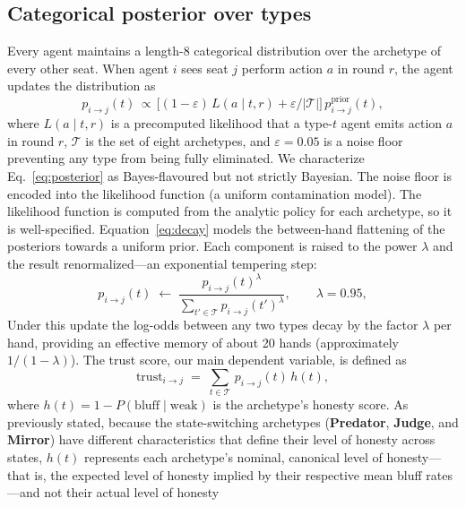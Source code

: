 \documentclass[10pt,twocolumn,letterpaper]{article}
\newcommand{\arch}[1]{\textbf{#1}}
\begin{document}
\subsection{Categorical posterior over types}\label{sec:posterior}
Every agent maintains a length-8 categorical distribution over the
archetype of every other seat. When agent $i$ sees seat $j$ perform
action $a$ in round $r$, the agent updates the distribution as
\begin{equation}
  p_{i\to j}(t)\,\propto\,
    \bigl[(1-\varepsilon)\,L(a\mid t,r)
          + \varepsilon/|\mathcal{T}|\bigr]\,
    p_{i\to j}^{\text{prior}}(t),
  \label{eq:posterior}
\end{equation}
where $L(a\mid t, r)$ is a precomputed likelihood that a type-$t$
agent emits action $a$ in round $r$, $\mathcal{T}$ is the set of
eight archetypes, and $\varepsilon = 0.05$ is a noise floor
preventing any type from being fully eliminated. We characterize
Eq.~\ref{eq:posterior} as Bayes-flavoured but not strictly
Bayesian. The noise floor is encoded into the likelihood function
(a uniform contamination model). The likelihood function is computed
from the analytic policy for each archetype, so it is well-specified.
Equation~\ref{eq:decay} models the between-hand flattening of the
posteriors towards a uniform prior. Each component is raised to the
power $\lambda$ and the result renormalized---an exponential
tempering step:
\begin{equation}
  p_{i\to j}(t) \;\leftarrow\;
    \frac{p_{i\to j}(t)^{\lambda}}
         {\sum_{t'\in\mathcal{T}} p_{i\to j}(t')^{\lambda}},
  \qquad \lambda = 0.95,
  \label{eq:decay}
\end{equation}
Under this update the log-odds between any two types decay by the
factor $\lambda$ per hand, providing an effective memory of about 20
hands (approximately $1/(1-\lambda)$). The trust score, our main dependent variable, is
defined as
\begin{equation}
  \text{trust}_{i\to j} \;=\;
    \sum_{t\in\mathcal{T}}\, p_{i\to j}(t)\, h(t),
  \label{eq:trust}
\end{equation}
where $h(t) = 1 - P(\text{bluff}\mid\text{weak})$ is the
archetype's honesty
score. As previously stated, because the state-switching archetypes
(\arch{Predator}, \arch{Judge}, and \arch{Mirror}) have different
characteristics that define their level of honesty across states,
$h(t)$ represents each archetype's nominal, canonical level of
honesty---that is, the expected level of honesty implied by their
respective mean bluff rates---and not their actual level of honesty
\end{document}
